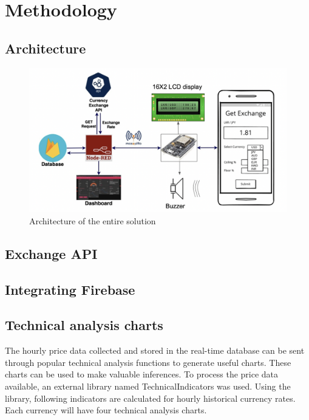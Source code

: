 \section{Methodology}

\subsection{Architecture}

\begin{figure}[h]
    \centering
      \includegraphics[width=1\textwidth]{images/arch.png}
    \caption{Architecture of the entire solution}
    \label{fig:arch}
\end{figure}

\subsection{Exchange API}

\subsection{Integrating Firebase}

\subsection{Technical analysis charts}

The hourly price data collected and stored in the real-time database can be sent through popular technical analysis functions to generate useful charts. These charts can be used to make valuable inferences. To process the price data available, an external library named TechnicalIndicators was used. Using the library, following indicators are calculated for hourly historical currency rates. Each currency will have four technical analysis charts.

